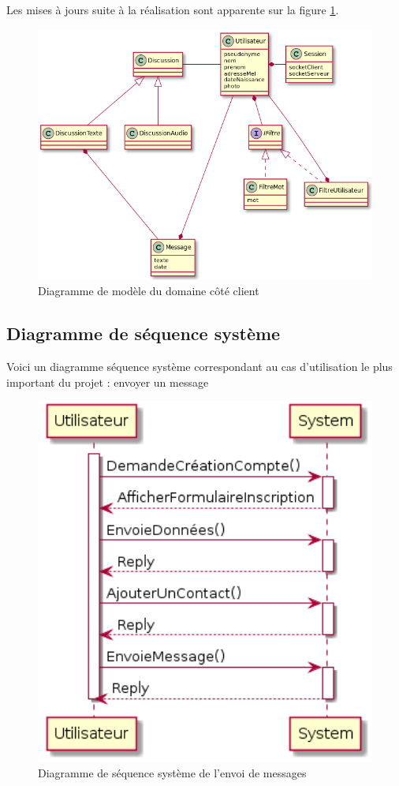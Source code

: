 		Les mises à jours suite à la réalisation sont apparente sur la figure \ref{modeleDomaineClient}.
		
	\begin{figure}[H]
	\centerline{\includegraphics[width=16.5cm]{img/modeleDomaineClient.png}}
		\caption{Diagramme de modèle du domaine côté client}
		\label{modeleDomaineClient}
	\end{figure}

	\newpage

	\subsection{Diagramme de séquence système}
	
	
	Voici un diagramme séquence système correspondant au cas d'utilisation le plus important du projet : envoyer un message
	\begin{figure}[H]
		\centerline{\includegraphics[width=12.5cm]{img/sequenceSystemeEnvoiMessage.png}}
		\caption{Diagramme de séquence système de l'envoi de messages}
	\end{figure}

